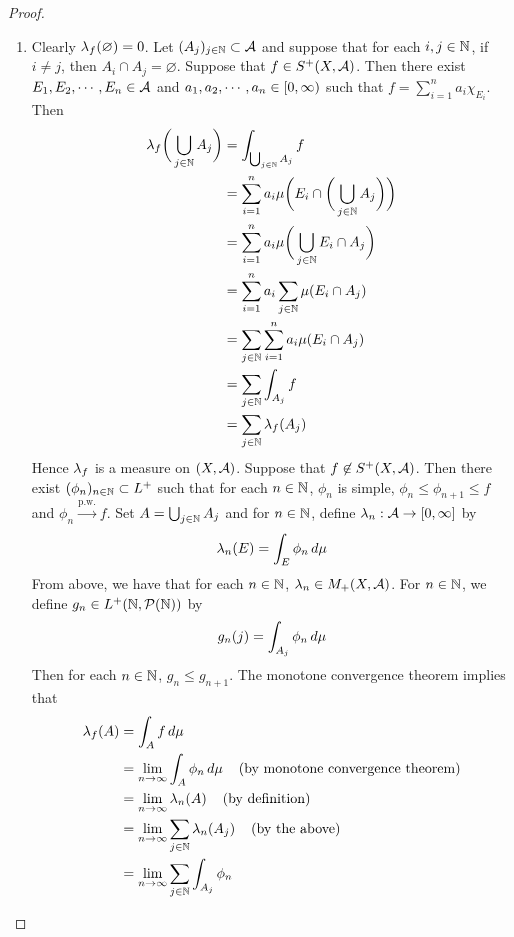 \documentclass{book}
\begin{document}
	\begin{proof}\
		\begin{enumerate}
			\item Clearly $\lambda_f(\varnothing) = 0$. Let $(A_j)_{j \in \mathbb{N}} \subset \mathcal{A}$ and suppose that for each $i, j \in \mathbb{N}$, if $i \neq j$, then $A_i \cap A_j = \varnothing$. Suppose that $f \in S^+(X, \mathcal{A})$. Then there exist $E_1, E_2, \cdots, E_n \in \mathcal{A}$ and  $a_1, a_2, \cdots, a_n \in [0,\infty)$ such that $f = \sum\limits_{i=1}^n a_i \chi_{E_i}$.  Then 
			\begin{align*}
				\lambda_f\bigg(\bigcup_{j \in \mathbb{N}} A_j\bigg) 
				&= \int_{\bigcup_{j \in \mathbb{N}} A_j} f\\
				&= \sum_{i = 1} ^n a_i\mu\bigg(E_i \cap \bigg(\bigcup_{j \in \mathbb{N}} A_j\bigg)\bigg)\\
				&= \sum_{i = 1} ^n a_i\mu\bigg(\bigcup_{j \in \mathbb{N}} E_i \cap A_j\bigg)\\
				&= \sum_{i = 1} ^n a_i \sum_{j \in \mathbb{N}} \mu(E_i \cap A_j)\\
				&= \sum_{j \in \mathbb{N}} \sum_{i = 1} ^n a_i \mu(E_i \cap A_j)\\
				&= \sum_{j \in \mathbb{N}} \int_{A_j} f\\
				&= \sum_{j \in \mathbb{N}} \lambda_f(A_j)
			\end{align*} 
			Hence $\lambda_f$ is a measure on $(X, \mathcal{A})$. Suppose that $f \not \in S^+(X, \mathcal{A})$. Then there exist $(\phi_n)_{n \in \mathbb{N}} \subset L^+$ such that for each $n \in \mathbb{N}$, $\phi_n$ is simple, $\phi_n \leq \phi_{n+1} \leq f$ and $\phi_n \xrightarrow{\text{p.w.}} f$. Set $A = \bigcup_{j \in \mathbb{N}}A_j$ and for $n \in \mathbb{N}$, define $\lambda_n: \mathcal{A} \rightarrow [0,\infty]$ by 
			$$\lambda_n(E) = \int_E \phi_n \, d \mu$$ 
			From above, we have that for each $n \in \mathbb{N}$, $\lambda_n \in M_+(X, \mathcal{A})$. For $n \in \mathbb{N}$, we define $g_n \in L^+(\mathbb{N}, \mathcal{P}(\mathbb{N}))$ by 
			$$g_n(j) = \int_{A_j} \phi_n \, d \mu $$ 
			Then for each $n \in \mathbb{N}$, $g_n \leq g_{n+1}$. 
			The monotone convergence theorem implies that
			\begin{align*}
				\lam_f(A) 
				& = \int_A f \dmu\\
				& = \limn \int_A \phi_n \dmu \hspace{4mm} \text{(by monotone convergence theorem)} \\ 
				& = \limn \lam_n(A) \hspace{4mm} \text{(by definition)} \\ 
				& = \limn \sum_{j \in \N} \lam_n(A_j)  \hspace{4mm} \text{(by the above)} \\
				& = \limn \sum_{j \in \N} \int_{A_j} \phi_n \\

\end{align*}
\end{enumerate}
\end{proof}
\end{document}
